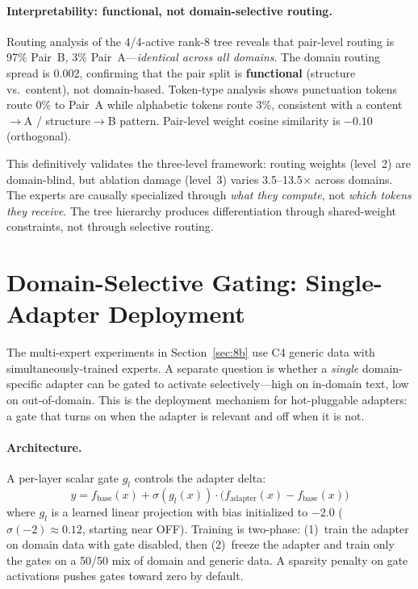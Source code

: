 \documentclass{article}
\begin{document}
\paragraph{Interpretability: functional, not domain-selective routing.}
Routing analysis of the 4/4-active rank-8 tree reveals that pair-level
routing is 97\% Pair~B, 3\% Pair~A---\emph{identical across all domains}.
The domain routing spread is 0.002, confirming that the pair split is
\textbf{functional} (structure vs.\ content), not domain-based. Token-type
analysis shows punctuation tokens route 0\% to Pair~A while alphabetic
tokens route 3\%, consistent with a content$\to$A / structure$\to$B
pattern. Pair-level weight cosine similarity is $-0.10$ (orthogonal).

This definitively validates the three-level framework: routing weights
(level~2) are domain-blind, but ablation damage (level~3) varies
3.5--13.5$\times$ across domains. The experts are causally specialized
through \emph{what they compute}, not \emph{which tokens they receive}.
The tree hierarchy produces differentiation through shared-weight
constraints, not through selective routing.

\section{Domain-Selective Gating: Single-Adapter Deployment}
\label{sec:delta-gating}

The multi-expert experiments in Section~\ref{sec:8b} use C4 generic data with
simultaneously-trained experts. A separate question is whether a \emph{single}
domain-specific adapter can be gated to activate selectively---high on
in-domain text, low on out-of-domain. This is the deployment mechanism for
hot-pluggable adapters: a gate that turns on when the adapter is relevant and
off when it is not.

\paragraph{Architecture.}
A per-layer scalar gate $g_l$ controls the adapter delta:
\begin{equation}
    y = f_{\text{base}}(x) + \sigma(g_l(x)) \cdot \bigl(f_{\text{adapter}}(x) - f_{\text{base}}(x)\bigr)
\end{equation}
where $g_l$ is a learned linear projection with bias initialized to $-2.0$
($\sigma(-2) \approx 0.12$, starting near OFF). Training is two-phase: (1)~train
the adapter on domain data with gate disabled, then (2)~freeze the adapter and
train only the gates on a 50/50 mix of domain and generic data. A sparsity
penalty on gate activations pushes gates toward zero by default.
\end{document}
